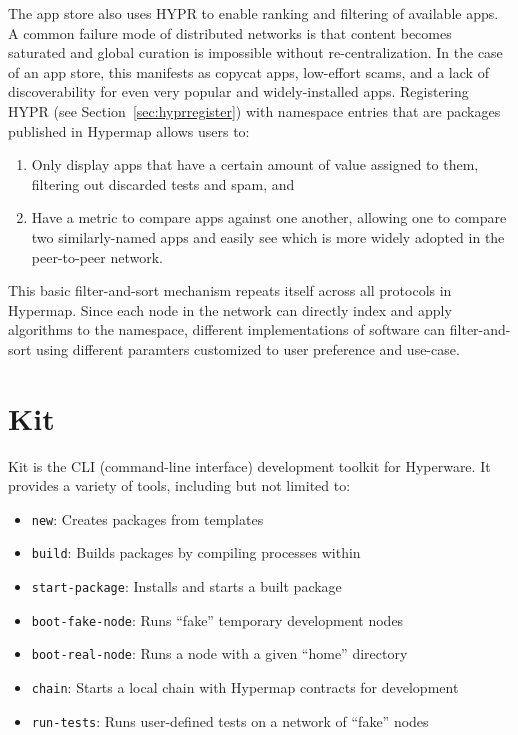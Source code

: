\documentclass[runningheads]{llncs}
\begin{document}
The app store also uses HYPR to enable ranking and filtering of available apps.
A common failure mode of distributed networks is that content becomes saturated and global curation is impossible without re-centralization.
In the case of an app store, this manifests as copycat apps, low-effort scams, and a lack of discoverability for even very popular and widely-installed apps.
Registering HYPR (see Section~\ref{sec:hyprregister}) with namespace entries that are packages published in Hypermap allows users to:
\begin{enumerate}
	\item Only display apps that have a certain amount of value assigned to them, filtering out discarded tests and spam, and
	\item Have a metric to compare apps against one another, allowing one to compare two similarly-named apps and easily see which is more widely adopted in the peer-to-peer network.
\end{enumerate}
This basic filter-and-sort mechanism repeats itself across all protocols in Hypermap.
Since each node in the network can directly index and apply algorithms to the namespace, different implementations of software can filter-and-sort using different paramters customized to user preference and use-case.

\section{Kit}

Kit is the CLI (command-line interface) development toolkit for Hyperware.
It provides a variety of tools, including but not limited to:
\begin{itemize}
	\item \verb|new|: Creates packages from templates
	\item \verb|build|: Builds packages by compiling processes within
	\item \verb|start-package|: Installs and starts a built package
	\item \verb|boot-fake-node|: Runs ``fake'' temporary development nodes
	\item \verb|boot-real-node|: Runs a node with a given ``home'' directory
	\item \verb|chain|: Starts a local chain with Hypermap contracts for development
	\item \verb|run-tests|: Runs user-defined tests on a network of ``fake'' nodes
\end{itemize}
\end{document}
